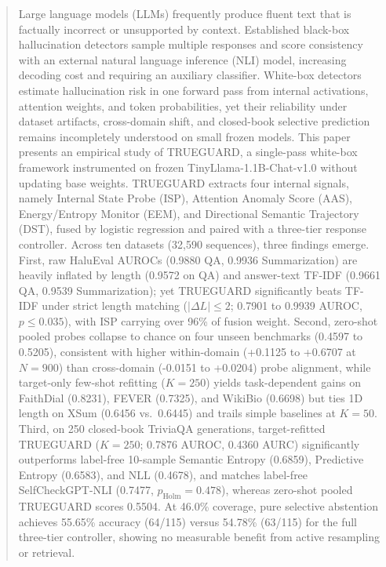 \documentclass{ieeeaccess}
\begin{document}
\begin{abstract}
Large language models (LLMs) frequently produce fluent text that is factually incorrect or unsupported by context. Established black-box hallucination detectors sample multiple responses and score consistency with an external natural language inference (NLI) model, increasing decoding cost and requiring an auxiliary classifier. White-box detectors estimate hallucination risk in one forward pass from internal activations, attention weights, and token probabilities, yet their reliability under dataset artifacts, cross-domain shift, and closed-book selective prediction remains incompletely understood on small frozen models. This paper presents an empirical study of TRUEGUARD, a single-pass white-box framework instrumented on frozen TinyLlama-1.1B-Chat-v1.0 without updating base weights. TRUEGUARD extracts four internal signals, namely Internal State Probe (ISP), Attention Anomaly Score (AAS), Energy/Entropy Monitor (EEM), and Directional Semantic Trajectory (DST), fused by logistic regression and paired with a three-tier response controller. Across ten datasets (32,590 sequences), three findings emerge. First, raw HaluEval AUROCs (0.9880 QA, 0.9936 Summarization) are heavily inflated by length (0.9572 on QA) and answer-text TF-IDF (0.9661 QA, 0.9539 Summarization); yet TRUEGUARD significantly beats TF-IDF under strict length matching ($|\Delta L| \le 2$; 0.7901 to 0.9939 AUROC, $p \le 0.035$), with ISP carrying over 96\% of fusion weight. Second, zero-shot pooled probes collapse to chance on four unseen benchmarks (0.4597 to 0.5205), consistent with higher within-domain (+0.1125 to +0.6707 at $N=900$) than cross-domain (-0.0151 to +0.0204) probe alignment, while target-only few-shot refitting ($K=250$) yields task-dependent gains on FaithDial (0.8231), FEVER (0.7325), and WikiBio (0.6698) but ties 1D length on XSum (0.6456 vs.\ 0.6445) and trails simple baselines at $K=50$. Third, on 250 closed-book TriviaQA generations, target-refitted TRUEGUARD ($K=250$; 0.7876 AUROC, 0.4360 AURC) significantly outperforms label-free 10-sample Semantic Entropy (0.6859), Predictive Entropy (0.6583), and NLL (0.4678), and matches label-free SelfCheckGPT-NLI (0.7477, $p_{\text{Holm}}=0.478$), whereas zero-shot pooled TRUEGUARD scores 0.5504. At 46.0\% coverage, pure selective abstention achieves 55.65\% accuracy (64/115) versus 54.78\% (63/115) for the full three-tier controller, showing no measurable benefit from active resampling or retrieval.
\end{abstract}
\end{document}
